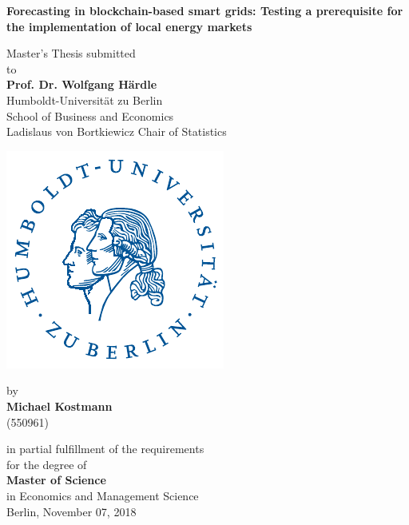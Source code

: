 \begin{center}
\vspace*{0.5cm}

    {\Large{\bf Forecasting in blockchain-based smart grids: Testing a prerequisite for the implementation of local energy markets}} \vspace{1cm}


    {\normalsize Master's Thesis submitted\\\vspace{0.5cm}
    to}\\\vspace{0.5cm}
    {\normalsize{\bf Prof. Dr. Wolfgang H\"ardle}} \\\vspace{0.5cm}
    {\normalsize Humboldt-Universit\"at zu Berlin \\
    School of Business and Economics \\
    Ladislaus von Bortkiewicz Chair of Statistics} \vspace{1cm}
    
    \includegraphics[]{thesis/figures/logo.pdf}
    \vspace{1cm}

    {\normalsize by \\\vspace{0.5cm}
    {\bf Michael Kostmann} \\
    (550961)} \vspace{1cm}


    {\normalsize in partial fulfillment of the requirements \\
    for the degree of \\
    {\bf Master of Science} \\
    in Economics and Management Science \\\vspace{1cm}
    Berlin, November 07,  2018}

\end{center}

